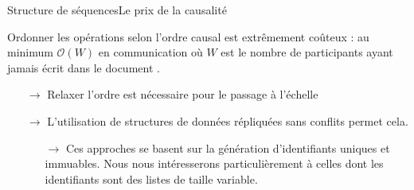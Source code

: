 





%     


\begin{frame}{Structure de séquences}{Le prix de la causalité}
  
  Ordonner les opérations selon l'ordre causal est extrêmement coûteux : au
  minimum $\mathcal{O}(W)$ en communication où $W$ est le nombre de participants
  ayant jamais écrit dans le document \REF.
  \begin{itemize}
  \item[$\rightarrow$] Relaxer l'ordre est nécessaire pour le passage à l'échelle
  \end{itemize}
  
  \vspace{0.5cm}
  
  \large
  \begin{itemize}
  \item [$\rightarrow$] L'utilisation de structures de données répliquées sans
    conflits \REF permet cela.
    \begin{itemize}
    \item [$\rightarrow$] Ces approches se basent sur la génération
      d'identifiants uniques et immuables. Nous nous intéresserons
      particulièrement à celles dont les identifiants sont des listes de taille
      variable.
    \end{itemize}
  \end{itemize}

\end{frame}

